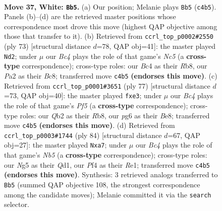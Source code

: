 \documentclass[11pt]{article}
\begin{document}
\clearpage

\begin{figure}[p]\centering
\begin{subfigure}{0.46\textwidth}\centering
\resizebox{\linewidth}{!}{%
\newchessgame
\chessboard[
  setfen={2b3k1/3nrp1p/2q3p1/4PpN1/p1B2P2/8/PQP2KPP/6R1 w - - 10 37},
  showmover=false,
  pgfstyle=straightmove, color=movearrow, markmove={c4-b5}
]}
\caption{}
\end{subfigure}\hfill
\begin{subfigure}{0.46\textwidth}\centering
\resizebox{\linewidth}{!}{%
\newchessgame
\chessboard[
  setfen={1rb5/4qkp1/2p2p2/P2p4/1PnQ2P1/3N1P2/7P/1R3BK1 b - - 3 37},
  showmover=false,
  pgfstyle=straightmove, color=movearrow, markmove={c4-d2}
]}
\caption{}
\end{subfigure}
\\[4pt]
\begin{subfigure}{0.46\textwidth}\centering
\resizebox{\linewidth}{!}{%
\newchessgame
\chessboard[
  setfen={1r2b1k1/4q2p/3pP3/3Bn1p1/4Np2/4P2P/1p3PP1/1R1Q2K1 b - - 3 39},
  showmover=false,
  pgfstyle=straightmove, color=movearrow, markmove={f4-e3}
]}
\caption{}
\end{subfigure}\hfill
\begin{subfigure}{0.46\textwidth}\centering
\resizebox{\linewidth}{!}{%
\newchessgame
\chessboard[
  setfen={5b1k/p2p1p1p/1pr3pn/1Nq5/2P3P1/P2B4/KP5P/3QR3 w - - 5 43},
  showmover=false,
  pgfstyle=straightmove, color=movearrow, markmove={b5-a7}
]}
\caption{}
\end{subfigure}
\caption{\textbf{Move 37, White: \texttt{Bb5}.} (a) Our position; Melanie plays \texttt{Bb5} (\texttt{c4b5}). Panels (b)--(d) are the retrieved master positions whose correspondence most drove this move (highest QAP objective among those that transfer to it). (b) Retrieved from \texttt{ccrl\_top\_p0002\#2550} (ply 73) [structural distance $d$=78, QAP obj=41]: the master played \texttt{Nd2}; under $\mu$ our \emph{Bc4} plays the role of that game's \emph{Nc5} (a \textbf{cross-type} correspondence); cross-type roles: our \emph{B}c4 as their \emph{R}b8, our \emph{P}a2 as their \emph{B}c8; transferred move \texttt{c4b5} \textbf{(endorses this move)}. (c) Retrieved from \texttt{ccrl\_top\_p0001\#3651} (ply 77) [structural distance $d$=73, QAP obj=40]: the master played \texttt{fxe3}; under $\mu$ our \emph{Bc4} plays the role of that game's \emph{Pf5} (a \textbf{cross-type} correspondence); cross-type roles: our \emph{Q}b2 as their \emph{R}b8, our \emph{p}g6 as their \emph{B}e8; transferred move \texttt{c4b5} \textbf{(endorses this move)}. (d) Retrieved from \texttt{ccrl\_top\_p0003\#1744} (ply 84) [structural distance $d$=67, QAP obj=27]: the master played \texttt{Nxa7}; under $\mu$ our \emph{Bc4} plays the role of that game's \emph{Nb5} (a \textbf{cross-type} correspondence); cross-type roles: our \emph{N}g5 as their \emph{Q}d1, our \emph{P}f4 as their \emph{R}e1; transferred move \texttt{c4b5} \textbf{(endorses this move)}. Synthesis: 3 retrieved analogs transferred to \texttt{Bb5} (summed QAP objective 108, the strongest correspondence among the candidate moves); Melanie committed it via the \texttt{search} selector.}
\label{fig:thought-m72}
\end{figure}
\end{document}
